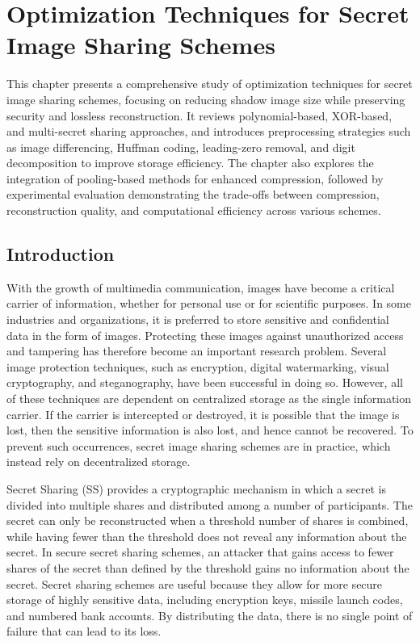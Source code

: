 \chapter{Optimization Techniques for Secret Image Sharing Schemes}
This chapter presents a comprehensive study of optimization techniques for secret image sharing schemes, focusing on reducing shadow image size while preserving security and lossless reconstruction. It reviews polynomial-based, XOR-based, and multi-secret sharing approaches, and introduces preprocessing strategies such as image differencing, Huffman coding, leading-zero removal, and digit decomposition to improve storage efficiency. The chapter also explores the integration of pooling-based methods for enhanced compression, followed by experimental evaluation demonstrating the trade-offs between compression, reconstruction quality, and computational efficiency across various schemes.

\section{Introduction}
 
With the growth of multimedia communication, images have become a critical carrier of information, whether for personal use or for scientific purposes. In some industries and organizations, it is preferred to store sensitive and confidential data in the form of images. Protecting these images against unauthorized access and tampering has therefore become an important research problem. Several image protection techniques, such as encryption, digital watermarking, visual cryptography, and steganography, have been successful in doing so. However, all of these techniques are dependent on centralized storage as the single information carrier. If the carrier is intercepted or destroyed, it is possible that the image is lost, then the sensitive information is also lost, and hence cannot be recovered. To prevent such occurrences, secret image sharing schemes are in practice, which instead rely on decentralized storage.

 
Secret Sharing (SS) provides a cryptographic mechanism in which a secret is divided into multiple shares and distributed among a number of participants. The secret can only be reconstructed when a threshold number of shares is combined, while having fewer than the threshold does not reveal any information about the secret. In secure secret sharing schemes, an attacker that gains access to fewer shares of the secret than defined by the threshold gains no information about the secret. Secret sharing schemes are useful because they allow for more secure storage of highly sensitive data, including encryption keys, missile launch codes, and numbered bank accounts. By distributing the data, there is no single point of failure that can lead to its loss.
 
